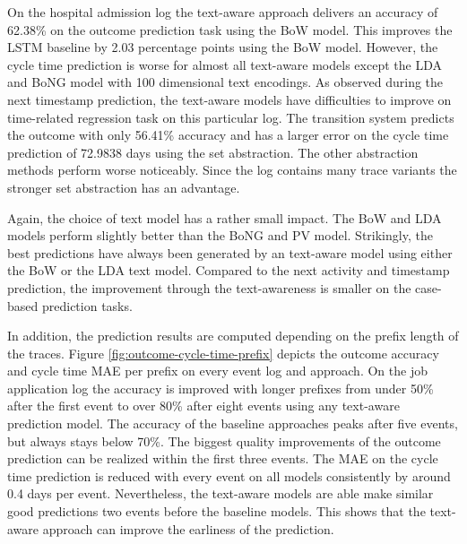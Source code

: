 On the hospital admission log the text-aware approach delivers an accuracy of 62.38\% on the outcome prediction task using the BoW model.
This improves the LSTM baseline by 2.03 percentage points using the BoW model.
However, the cycle time prediction is worse for almost all text-aware models except the LDA and BoNG model with 100 dimensional text encodings.
As observed during the next timestamp prediction, the text-aware models have difficulties to improve on time-related regression task on this particular log.
The transition system predicts the outcome with only 56.41\% accuracy and has a larger error on the cycle time prediction of 72.9838 days using the set abstraction.
The other abstraction methods perform worse noticeably.
Since the log contains many trace variants the stronger set abstraction has an advantage.

Again, the choice of text model has a rather small impact.
The BoW and LDA models perform slightly better than the BoNG and PV model.
Strikingly, the best predictions have always been generated by an text-aware model using either the BoW or the LDA text model.
Compared to the next activity and timestamp prediction, the improvement through the text-awareness is smaller on the case-based prediction tasks.

In addition, the prediction results are computed depending on the prefix length of the traces.
Figure \ref{fig:outcome-cycle-time-prefix} depicts the outcome accuracy and cycle time MAE per prefix on every event log and approach.
On the job application log the accuracy is improved with longer prefixes from under 50\% after the first event to over 80\% after eight events using any text-aware prediction model.
The accuracy of the baseline approaches peaks after five events, but always stays below 70\%.
The biggest quality improvements of the outcome prediction can be realized within the first three events.
The MAE on the cycle time prediction is reduced with every event on all models consistently by around 0.4 days per event.
Nevertheless, the text-aware models are able make similar good predictions two events before the baseline models.
This shows that the text-aware approach can improve the earliness of the prediction.

